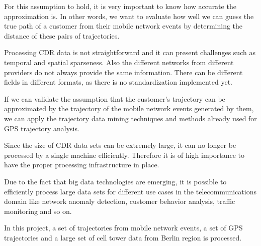 For this assumption to hold, it is very important to know how accurate the approximation is. In other words, we want to evaluate how well we can guess the true path of a customer from their mobile network events by determining the distance of these pairs of trajectories. 

Processing CDR data is not straightforward and it can present challenges such as temporal and spatial sparseness. Also the different networks from different providers do not always provide the same information. There can be different fields in different formats, as there is no standardization implemented yet. 

If we can validate the assumption that the customer's trajectory can be approximated by the trajectory of the mobile network events generated by them, we can apply the trajectory data mining techniques and methods already used for GPS trajectory analysis. 

Since the size of CDR data sets can be extremely large, it can no longer be processed by a single machine efficiently. Therefore it is of high importance to have the proper processing infrastructure in place.  

Due to the fact that big data technologies are emerging, it is possible to efficiently process large data sets for different use cases in the telecommunications domain like network anomaly detection, customer behavior analysis, traffic monitoring and so on.

In this project, a set of trajectories from mobile network events, a set of GPS trajectories and a large set of cell tower data from Berlin region is processed. 


